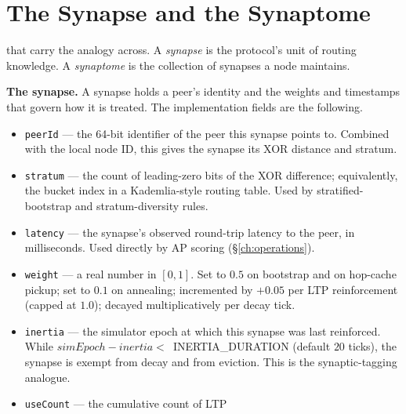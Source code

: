 \documentclass[twoside,nobib]{tufte-book}
\begin{document}
\section{The Synapse and the Synaptome}

 that carry the analogy across.
A \emph{synapse} is the protocol's unit of routing knowledge. A
\emph{synaptome} is the collection of synapses a node maintains.

\textbf{The synapse.} A synapse holds a peer's identity and the
weights and timestamps that govern how it is treated. The
implementation fields are the following.

\begin{itemize}\setlength\itemsep{0.2em}
  \item \texttt{peerId} --- the 64-bit identifier of the peer this
  synapse points to. Combined with the local node ID, this gives
  the synapse its XOR distance and stratum.
  \item \texttt{stratum} --- the count of leading-zero bits of the
  XOR difference; equivalently, the bucket index in a Kademlia-style
  routing table. Used by stratified-bootstrap and stratum-diversity
  rules.
  \item \texttt{latency} --- the synapse's observed round-trip
  latency to the peer, in milliseconds. Used directly by AP scoring
  (\S\ref{ch:operations}).
  \item \texttt{weight} --- a real number in $[0, 1]$. Set to $0.5$
  on bootstrap and on hop-cache pickup; set to $0.1$ on annealing;
  incremented by $+0.05$ per LTP reinforcement (capped at $1.0$);
  decayed multiplicatively per decay tick.
  \item \texttt{inertia} --- the simulator epoch at which this
  synapse was last reinforced. While $\mathit{simEpoch} -
  \mathit{inertia} <$~\textsc{INERTIA\_DURATION} (default $20$
  ticks), the synapse is exempt from decay and from eviction. This
  is the synaptic-tagging analogue.
  \item \texttt{useCount} --- the cumulative count of LTP

\end{itemize}
\end{document}
